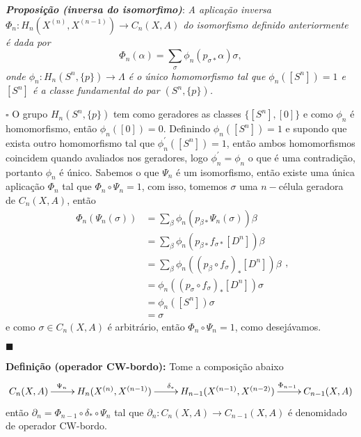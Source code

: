 \documentclass[12pt]{book}
\newcommand{\homologiarel}[3]{H_{#1}(#2,#3)}
\newcommand{\homologiarelskele}[3]{H_{#1}(X^{(#2)}, X^{(#3)})}
\newcommand{\homologiarelskelesimpl}[2]{H_{#1}(X^{(#2)}, X^{(#2-1)})}
\newcommand{\definicaonomeada}[2]{\vspace{2mm} \textbf{Definição (#1):}{ #2}}
\newcommand{\tese}[3]{\vspace{2mm} \textit{\textbf{#1}}: \textit{#2} \par $\square$ #3 \par $\blacksquare$}
\begin{document}
	\tese{Proposição (inversa do isomorfimo)}{A aplicação inversa $\Phi_{n} : \homologiarelskelesimpl{n}{n} \to C_{n}(X,A)$ do isomorfismo definido anteriormente é dada por
	$$
	\Phi_{n}(\alpha) = \sum_{\sigma} \phi_{n}(p_{\sigma *}\alpha)\sigma,
	$$
	onde $\phi_{n}: \homologiarel{n}{S^{n}}{\{p\}} \to \Lambda$ é o único homomorfismo tal que $\phi_{n}([S^{n}])=1$ e $[S^{n}]$ é a classe fundamental do par $(S^{n}, \{p\})$.}{O grupo $\homologiarel{n}{S^{n}}{\{p\}}$ tem como geradores as classes $\{[S^{n}], [0]\}$ e como $\phi_{n}$ é homomorfismo, então $\phi_{n}([0]) = 0$. Definindo $\phi_{n}([S^{n}]) = 1$ e supondo que exista outro homomorfismo tal que $\phi_{n}^{'} ([S^{n}]) = 1$, então ambos homomorfismos coincidem quando avaliados nos geradores, logo $\phi_{n}^{'}=\phi_{n}$ o que é uma contradição, portanto $\phi_{n}$ é único. Sabemos o que $\Psi_{n}$ é um isomorfismo, então existe uma única aplicação $\Phi_{n}$ tal que $\Phi_{n} \circ \Psi_{n} = 1$, com isso, tomemos $\sigma$ uma $n-$célula geradora de $C_{n}(X,A)$, então
	$$
	\begin{aligned}
	\Phi_{n}(\Psi_{n}(\sigma)) 
	&= \sum_{\beta}\phi_{n}(p_{\beta *}\Psi_{n}(\sigma))\beta
	\\
	&= \sum_{\beta}\phi_{n}(p_{\beta *}f_{\sigma *}[D^{n}])\beta
	\\
	&= \sum_{\beta}\phi_{n}((p_{\beta}\circ f_{\sigma})_{*}[D^{n}])\beta
	\\
	&= \phi_{n}((p_{\sigma}\circ f_{\sigma})_{*}[D^{n}])\sigma
	\\
	&= \phi_{n}([S^{n}])\sigma
	\\
	&= \sigma	
	\end{aligned},
	$$
	e como $\sigma \in C_{n}(X,A)$ é arbitrário, então $\Phi_{n} \circ \Psi_{n} = 1$, como desejávamos.
	}
	
	\definicaonomeada{operador CW-bordo}{Tome a composição abaixo
	\[
	\xymatrix{
		C_{n}(X,A) \ar[r]^{\Psi_{n}\qquad} &
		\homologiarelskelesimpl{n}{n} \ar[r]^{\delta_{*}} & 
		\homologiarelskele{n-1}{n-1}{n-2} \ar[r]^{\qquad \Phi_{n-1}}&
		C_{n-1}(X,A)
		}
	\]
	então $\partial_{n} = \Phi_{n-1} \circ \delta_{*} \circ \Psi_{n}$ tal que $\partial_{n}: C_{n}(X,A) \to C_{n-1}(X,A)$ é denomidado de operador CW-bordo.}
\end{document}
